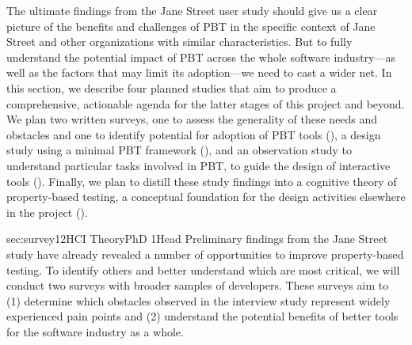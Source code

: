 The ultimate findings from the Jane Street user study\iflater{}\fi{} should
give us a clear
picture of the benefits and challenges of PBT in the specific context
of Jane Street and other organizations with similar characteristics.  But to
fully understand the potential impact of PBT across the whole software
industry---as well as the factors that may limit its adoption---we need to
cast a wider net.
%
In this section, we describe four planned studies that aim
to produce a comprehensive, actionable
agenda for the latter stages of this project and beyond.  We plan two
written surveys, one to assess the generality of these needs and obstacles
and one to identify potential for adoption of PBT tools
(), a design study using a minimal PBT
framework (), and an observation study to understand
particular tasks involved in PBT, to guide the design of
interactive tools
(). Finally, we plan to distill these
study findings into a cognitive
theory of property-based testing, a conceptual foundation for the
design activities elsewhere in the project ().


%
   {sec:survey}{1}{2}{HCI Theory}{PhD 1}{}{Head}
%
Preliminary findings from the Jane Street study have already revealed
a number of
opportunities to improve property-based testing. To identify
others and better understand which are most
critical, we will conduct two
surveys with broader samples of developers. These surveys aim to
(1) determine which obstacles observed in the interview
study\iflater{}\fi{}
represent widely experienced pain points and
(2) understand the potential benefits of better tools for the
software industry as a whole.

